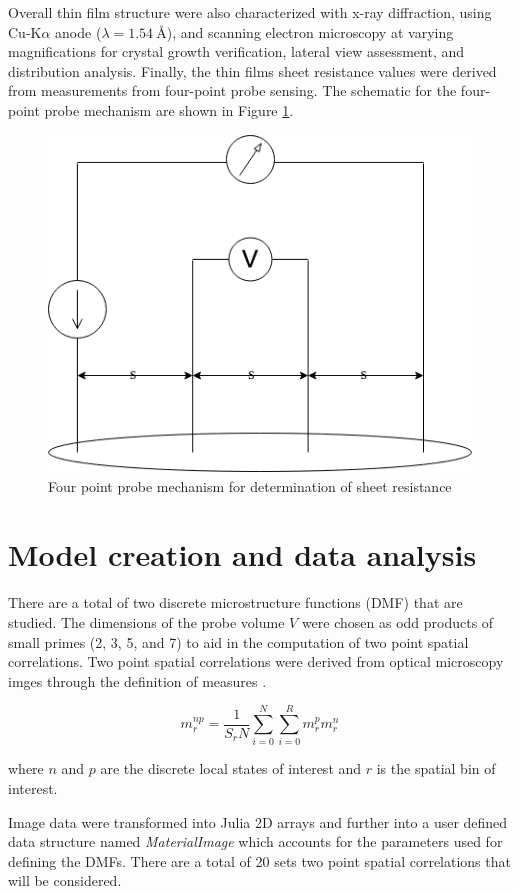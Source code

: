 Overall thin film structure were also characterized with x-ray diffraction, using Cu-K$\alpha$ anode ($\lambda = \SI{1.54}{\angstrom}$), and scanning electron microscopy at varying magnifications for crystal growth verification, lateral view assessment, and distribution analysis.
Finally, the thin films sheet resistance values were derived from measurements from four-point probe sensing.
The schematic for the four-point probe mechanism are shown in Figure \ref{fig:fpt}.

\begin{figure}
  \centering
  \includegraphics[scale=0.3]{FourPoint}
  \caption{Four point probe mechanism for determination of sheet resistance}
  \label{fig:fpt}
\end{figure}

\section{Model creation and data analysis}
There are a total of two discrete microstructure functions (DMF) that are studied.
The dimensions of the probe volume $V$ were chosen as odd products of small primes (2, 3, 5, and 7) to aid in the computation of two point spatial correlations.
Two point spatial correlations were derived from optical microscopy imges through the definition of measures \cite{gupta15}.

\[
  m^{np}_r = \dfrac{1}{S_rN} \sum_{i=0}^{N} \sum_{i=0}^{R} m^p_r m^n_r
\]

where $n$ and $p$ are the discrete local states of interest and $r$ is the spatial bin of interest.

Image data were transformed into Julia 2D arrays \cite{julia15} and further into a user defined data structure named \emph{MaterialImage} which accounts for the parameters used for defining the DMFs.
There are a total of 20 sets two point spatial correlations that will be considered.

